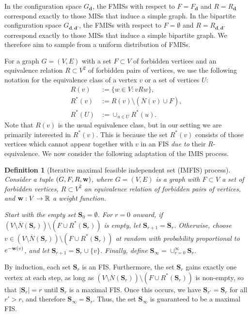 \documentclass{article}
\theoremstyle{plain}
\theoremstyle{remark}
\theoremstyle{plain}
\newtheorem{definition}[theorem]{Definition}
\numberwithin{equation}{section}
\renewcommand{\d}{{\boldsymbol{d}}}
\renewcommand{\b}{{\bf{w}}}
\begin{document}
	In the configuration space $G_\d$, the FMISs with respect to $F=F_\d$ and $R=R_\d$ correspond exactly to those MISs that induce a simple graph. In the bipartite configuration space $G_{\d,\d'}$, the FMISs with respect to $F=\emptyset$ and $R=R_{\d,\d'}$ correspond exactly to those MISs that induce a simple bipartite graph. We therefore aim to sample from a uniform distribution of FMISs.
	
	For a graph $G=(V,E)$ with a set $F\subset V$ of forbidden vertices and an equivalence relation $R\subset V^2$ of forbidden pairs of vertices, we use the following notation for the equivalence class of a vertex $v$ or a set of vertices $U$:
	\begin{align}
		R(v)&:=\{w\in V:vRw\},
		\\R^*(v)&:=R(v)\setminus(\overline{N}(v)\cup F),
		\\R^*(U)&:=\cup_{u\in U}R^*(u).
	\end{align}
	Note that $R(v)$ is the usual equivalence class, but in our setting we are primarily interested in $R^*(v)$. This is because the set $R^*(v)$ consists of those vertices which cannot appear together with $v$ in an FIS \emph{due to} their $R$-equivalence. We now consider the following adaptation of the IMIS process.
	
	\begin{definition}[Iterative maximal feasible independent set (IMFIS) process]\label{definition_imfis}
		Consider a tuple $(G,F,R,\b)$, where $G=(V,E)$ is a graph with $F\subset V$ a set of forbidden vertices, $R\subset V^2$ an equivalence relation of forbidden pairs of vertices, and $\b:V\to\mathbb{R}$ a weight function.
		
		Start with the empty set $\boldsymbol{S}_0=\emptyset$. For $r=0$ onward, if $(V\setminus\overline{N}(\boldsymbol{S}_r))\setminus(F\cup R^*(\boldsymbol{S}_r))$ is empty, let $\boldsymbol{S}_{r+1}=\boldsymbol{S}_r$. Otherwise, choose $v\in(V\setminus\overline{N}(\boldsymbol{S}_r))\setminus(F\cup R^*(\boldsymbol{S}_r))$ at random with probability proportional to $e^{-\b(v)}$, and let $\boldsymbol{S}_{r+1}=\boldsymbol{S}_r\cup\{v\}$. Finally, define $\boldsymbol{S}_{\infty}=\cup_{r=0}^{\infty}\boldsymbol{S}_r$.
	\end{definition}
	
	By induction, each set $\boldsymbol{S}_r$ is an FIS. Furthermore, the set $\boldsymbol{S}_r$ gains exactly one vertex at each step, as long as $(V\setminus\overline{N}(\boldsymbol{S}_r))\setminus(F\cup R^*(\boldsymbol{S}_r))$ is non-empty, so that $|\boldsymbol{S}_r|=r$ until $\boldsymbol{S}_r$ is a maximal FIS. Once this occurs, we have $\boldsymbol{S}_{r'}=\boldsymbol{S}_r$ for all $r'>r$, and therefore $\boldsymbol{S}_{\infty}=\boldsymbol{S}_r$. Thus, the set $\boldsymbol{S}_{\infty}$ is guaranteed to be a maximal FIS.
	
\end{document}
